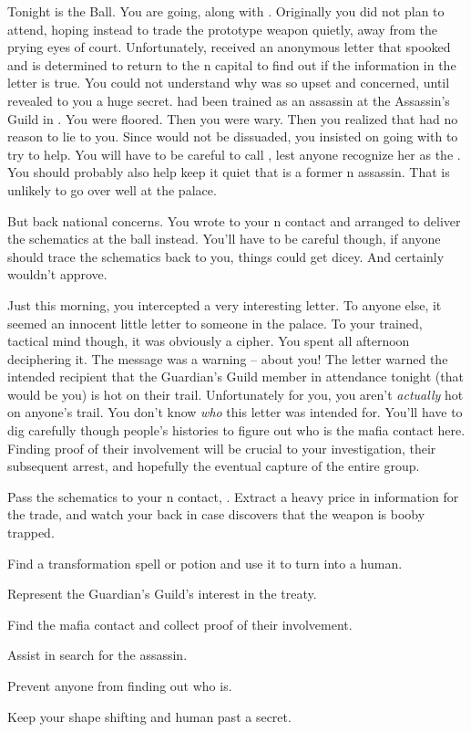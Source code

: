 \documentclass[char]{NeptuneBall}
\begin{document}
Tonight is the \cExExKing{} Ball. You are going, along with \cQueen{}. Originally you did not plan to attend, hoping instead to trade  the prototype weapon quietly, away from the prying eyes of court. Unfortunately, \cQueen{} received an anonymous letter that spooked \cQueen{\them} and \cQueen{\they} is determined to return to the \pAtlantis{}n capital to find out if the information in the letter is true. You could not understand why \cQueen{} was so upset and concerned, until \cQueen{\they} revealed to you a huge secret. \cQueen{} had been trained as an assassin at the Assassin's Guild in \pPacifica{}. You were floored. Then you were wary. Then you realized that \cQueen had no reason to lie to you. Since \cQueen{\they} would not be dissuaded, you insisted on going with \cQueen{\them} to try to help. You will have to be careful to call \cQueen{\them} \cQueen{\MYname}, lest anyone recognize her as the \cQueen{\King}. You should probably also help keep it quiet that  is a former \pPacifica{}n assassin. That is unlikely to go over well at the palace.

But back national concerns. You wrote to your \pPacifica{}n contact and arranged to deliver the schematics at the ball instead. You'll have to be careful though, if anyone should trace the schematics back to you, things could get dicey. And \cQueen{} certainly wouldn't approve.

Just this morning, you intercepted a very interesting letter. To anyone else, it seemed an innocent little letter to someone in the palace. To your trained, tactical mind though, it was obviously a cipher. You spent all afternoon deciphering it. The message was a warning -- about you! The letter warned the intended recipient that the Guardian's Guild member in attendance tonight (that would be you) is hot on their trail. Unfortunately for you, you aren't \emph{actually} hot on anyone's trail. You don't know \emph{who} this letter was intended for. You'll have to dig carefully though people's histories to figure out who is the mafia contact here. Finding proof of their involvement will be crucial to your investigation, their subsequent arrest, and hopefully the eventual capture of the entire group.


\begin{itemz}[Goals]
  \item Pass the schematics to your \pPacifica{}n contact, \cSpy{}. Extract a heavy price in information for the trade, and watch your back in case \cSpy{\they} discovers that the weapon is booby trapped.
  \item Find a transformation spell or potion and use it to turn \cQueen{} into a human.
  \item Represent the Guardian's Guild's interest in the treaty.
  \item Find the mafia contact and collect proof of their involvement.
  \item Assist \cQueen{} in \cQueen{\their} search for the assassin.
  \item Prevent anyone from finding out who \cQueen{} is.
  \item Keep your shape shifting and human past a secret.
\end{itemz}
\end{document}

